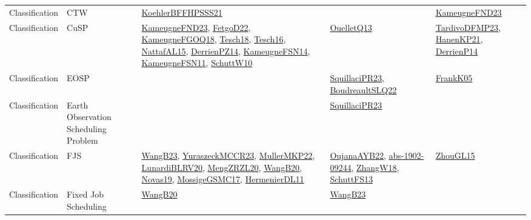 {\begin{longtable}{lp{3cm}>{\raggedright}p{6cm}>{\raggedright}p{6cm}p{8cm}}
Classification & CTW & \href{articles/KoehlerBFFHPSSS21.pdf}{KoehlerBFFHPSSS21}\cite{KoehlerBFFHPSSS21} &  & \href{papers/KameugneFND23.pdf}{KameugneFND23}\cite{KameugneFND23}\\
Classification & CuSP & \href{papers/KameugneFND23.pdf}{KameugneFND23}\cite{KameugneFND23}, \href{articles/FetgoD22.pdf}{FetgoD22}\cite{FetgoD22}, \href{papers/KameugneFGOQ18.pdf}{KameugneFGOQ18}\cite{KameugneFGOQ18}, \href{papers/Tesch18.pdf}{Tesch18}\cite{Tesch18}, \href{papers/Tesch16.pdf}{Tesch16}\cite{Tesch16}, \href{articles/NattafAL15.pdf}{NattafAL15}\cite{NattafAL15}, \href{papers/DerrienPZ14.pdf}{DerrienPZ14}\cite{DerrienPZ14}, \href{articles/KameugneFSN14.pdf}{KameugneFSN14}\cite{KameugneFSN14}, \href{papers/KameugneFSN11.pdf}{KameugneFSN11}\cite{KameugneFSN11}, \href{papers/SchuttW10.pdf}{SchuttW10}\cite{SchuttW10} & \href{papers/OuelletQ13.pdf}{OuelletQ13}\cite{OuelletQ13} & \href{papers/TardivoDFMP23.pdf}{TardivoDFMP23}\cite{TardivoDFMP23}, \href{papers/HanenKP21.pdf}{HanenKP21}\cite{HanenKP21}, \href{papers/DerrienP14.pdf}{DerrienP14}\cite{DerrienP14}\\
Classification & EOSP &  & \href{papers/SquillaciPR23.pdf}{SquillaciPR23}\cite{SquillaciPR23}, \href{papers/BoudreaultSLQ22.pdf}{BoudreaultSLQ22}\cite{BoudreaultSLQ22} & \href{papers/FrankK05.pdf}{FrankK05}\cite{FrankK05}\\
Classification & Earth Observation Scheduling Problem &  & \href{papers/SquillaciPR23.pdf}{SquillaciPR23}\cite{SquillaciPR23} & \\
Classification & FJS & \href{papers/WangB23.pdf}{WangB23}\cite{WangB23}, \href{articles/YuraszeckMCCR23.pdf}{YuraszeckMCCR23}\cite{YuraszeckMCCR23}, \href{articles/MullerMKP22.pdf}{MullerMKP22}\cite{MullerMKP22}, \href{articles/LunardiBLRV20.pdf}{LunardiBLRV20}\cite{LunardiBLRV20}, \href{articles/MengZRZL20.pdf}{MengZRZL20}\cite{MengZRZL20}, \href{papers/WangB20.pdf}{WangB20}\cite{WangB20}, \href{articles/Novas19.pdf}{Novas19}\cite{Novas19}, \href{papers/MossigeGSMC17.pdf}{MossigeGSMC17}\cite{MossigeGSMC17}, \href{papers/HermenierDL11.pdf}{HermenierDL11}\cite{HermenierDL11} & \href{papers/OujanaAYB22.pdf}{OujanaAYB22}\cite{OujanaAYB22}, \href{articles/abs-1902-09244.pdf}{abs-1902-09244}\cite{abs-1902-09244}, \href{articles/ZhangW18.pdf}{ZhangW18}\cite{ZhangW18}, \href{papers/SchuttFS13.pdf}{SchuttFS13}\cite{SchuttFS13} & \href{papers/ZhouGL15.pdf}{ZhouGL15}\cite{ZhouGL15}\\
Classification & Fixed Job Scheduling & \href{papers/WangB20.pdf}{WangB20}\cite{WangB20} & \href{papers/WangB23.pdf}{WangB23}\cite{WangB23} & \\

\end{longtable}}
